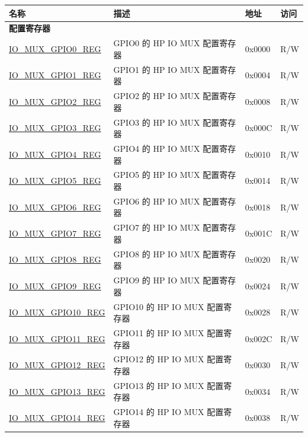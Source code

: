 \begin{longtable}{ | p{6cm} | p{7.2cm} | p{1.3cm} | p{1cm} | }
\hline\rowcolor{lightgray}
\textbf{名称} & \textbf{描述} &  \textbf{地址} & \textbf{访问} \\ \hline
\endhead
\multicolumn{4}{|l|}{\textbf{配置寄存器}} \\ \hline
\hyperref[regdesc:IOMUXGPIONREG]{IO\_MUX\_GPIO0\_REG} & GPIO0 的 HP IO MUX 配置寄存器& 0x0000 & R/W \\ \hline
\hyperref[regdesc:IOMUXGPIONREG]{IO\_MUX\_GPIO1\_REG} & GPIO1 的 HP IO MUX 配置寄存器 & 0x0004 & R/W \\ \hline
\hyperref[regdesc:IOMUXGPIONREG]{IO\_MUX\_GPIO2\_REG} & GPIO2 的 HP IO MUX 配置寄存器 & 0x0008 & R/W \\ \hline
\hyperref[regdesc:IOMUXGPIONREG]{IO\_MUX\_GPIO3\_REG} & GPIO3 的 HP IO MUX 配置寄存器 & 0x000C & R/W \\ \hline
\hyperref[regdesc:IOMUXGPIONREG]{IO\_MUX\_GPIO4\_REG} & GPIO4 的 HP IO MUX 配置寄存器 & 0x0010 & R/W \\ \hline
\hyperref[regdesc:IOMUXGPIONREG]{IO\_MUX\_GPIO5\_REG} & GPIO5 的 HP IO MUX 配置寄存器 & 0x0014 & R/W \\ \hline
\hyperref[regdesc:IOMUXGPIONREG]{IO\_MUX\_GPIO6\_REG} & GPIO6 的 HP IO MUX 配置寄存器 & 0x0018 & R/W \\ \hline
\hyperref[regdesc:IOMUXGPIONREG]{IO\_MUX\_GPIO7\_REG} & GPIO7 的 HP IO MUX 配置寄存器 & 0x001C & R/W \\ \hline
\hyperref[regdesc:IOMUXGPIONREG]{IO\_MUX\_GPIO8\_REG} & GPIO8 的 HP IO MUX 配置寄存器 & 0x0020 & R/W \\ \hline
\hyperref[regdesc:IOMUXGPIONREG]{IO\_MUX\_GPIO9\_REG} & GPIO9 的 HP IO MUX 配置寄存器 & 0x0024 & R/W \\ \hline
\hyperref[regdesc:IOMUXGPIONREG]{IO\_MUX\_GPIO10\_REG} & GPIO10 的 HP IO MUX 配置寄存器 & 0x0028 & R/W \\ \hline
\hyperref[regdesc:IOMUXGPIONREG]{IO\_MUX\_GPIO11\_REG} & GPIO11 的 HP IO MUX 配置寄存器 & 0x002C & R/W \\ \hline
\hyperref[regdesc:IOMUXGPIONREG]{IO\_MUX\_GPIO12\_REG} & GPIO12 的 HP IO MUX 配置寄存器 & 0x0030 & R/W \\ \hline
\hyperref[regdesc:IOMUXGPIONREG]{IO\_MUX\_GPIO13\_REG} & GPIO13 的 HP IO MUX 配置寄存器 & 0x0034 & R/W \\ \hline
\hyperref[regdesc:IOMUXGPIONREG]{IO\_MUX\_GPIO14\_REG} & GPIO14 的 HP IO MUX 配置寄存器 & 0x0038 & R/W \\ \hline

\end{longtable}
